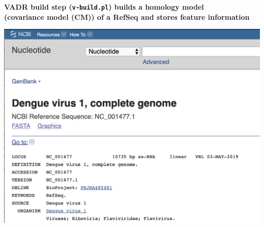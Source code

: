 \documentclass[landscape]{slides}
\begin{document}
\begin{slide}
\begin{center}
\textbf{VADR build step (\texttt{v-build.pl}) builds a homology model
  \\ (covariance model (CM)) of a RefSeq and stores feature information}

\includegraphics[width=6in]{figs/ss-001477-top}

\end{center}
\vfill
\end{slide}
\end{document}
